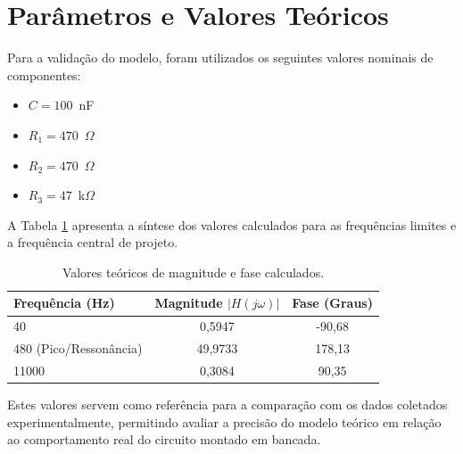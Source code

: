 \section{Parâmetros e Valores Teóricos}

Para a validação do modelo, foram utilizados os seguintes valores nominais de componentes:
\begin{itemize}
	\item $C = 100$~nF
	\item $R_1 = 470$~$\Omega$
	\item $R_2 = 470$~$\Omega$
	\item $R_3 = 47$~k$\Omega$
\end{itemize}

A Tabela \ref{tab:valores_teoricos} apresenta a síntese dos valores calculados para as frequências limites e a frequência central de projeto.

\begin{table}[H]
	\centering
	\caption{Valores teóricos de magnitude e fase calculados.}
	\label{tab:valores_teoricos}
	\begin{tabular}{l|c|c}
		\hline
		\textbf{Frequência (Hz)} & \textbf{Magnitude $|H(j\omega)|$} & \textbf{Fase (Graus)} \\ \hline
		40 & 0,5947 & -90,68 \\ [3pt]
		480 (Pico/Ressonância) & 49,9733 & 178,13 \\ [3pt]
		11000 & 0,3084 & 90,35 \\ [3pt]
		\hline
	\end{tabular}
\end{table}

Estes valores servem como referência para a comparação com os dados coletados experimentalmente, permitindo avaliar a precisão do modelo teórico em relação ao comportamento real do circuito montado em bancada.